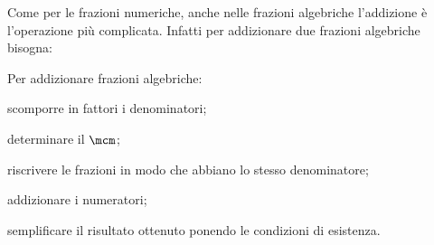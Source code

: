 Come per le frazioni numeriche, anche nelle frazioni algebriche l'addizione
è l'operazione più complicata. Infatti per addizionare due frazioni algebriche 
bisogna:

\begin{procedura}
 Per addizionare frazioni algebriche:
\begin{enumeratea}
\item scomporre in fattori i denominatori;
\item determinare il $\mcm$;
\item riscrivere le frazioni in modo che abbiano lo stesso denominatore;
\item addizionare i numeratori;
\item semplificare il risultato ottenuto ponendo le condizioni di esistenza.
\end{enumeratea}
\end{procedura}

